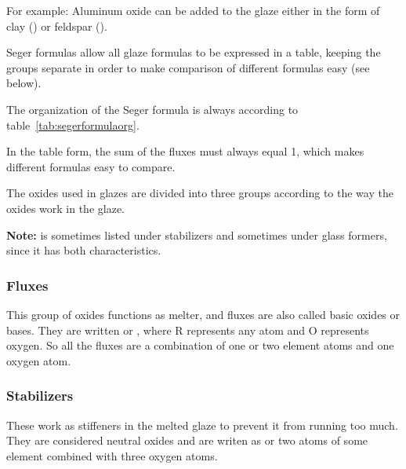 For example: Aluminum oxide can be added to the glaze either in the form of 
clay () or feldspar ().

Seger formulas allow all glaze formulas to be expressed in a table, keeping the 
groups separate in order to make comparison of different formulas easy (see 
below).

The organization of the Seger formula is always according to 
table~\ref{tab:segerformulaorg}.

In the table form, the sum of the fluxes must always equal 1, which makes 
different formulas easy to compare.

The oxides used in glazes are divided into three groups according to the way 
the oxides work in the glaze.

\textbf{Note:}  is sometimes listed under stabilizers and sometimes 
under glass formers, since it has both characteristics.
\subsubsection{Fluxes}
This group of oxides functions as melter, and fluxes are also called basic 
oxides or bases. They are written  or , where R represents any 
atom and O represents oxygen. So all the fluxes are a combination of one or two 
element atoms and one oxygen atom.
\subsubsection{Stabilizers}
These work as stiffeners in the melted glaze to prevent it from running too 
much. They are considered neutral oxides and are writen as  or two 
atoms of some element combined with three oxygen atoms.
